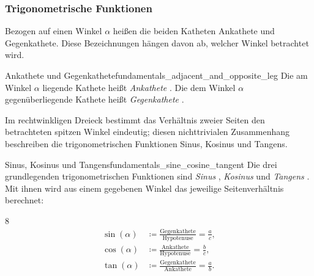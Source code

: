 \subsubsection{Trigonometrische Funktionen}
\label{subsubsec:fundamentals_right_triangles_trigonometric_ratios}

Bezogen auf einen Winkel $\alpha$ heißen die beiden Katheten Ankathete und
Gegenkathete. Diese Bezeichnungen hängen davon ab, welcher Winkel betrachtet
wird.

\begin{DefinitionBox}{Ankathete und Gegenkathete}{fundamentals_adjacent_and_opposite_leg}
  Die am Winkel $\alpha$ liegende Kathete heißt \emph{Ankathete}
  . Die dem Winkel $\alpha$ gegenüberliegende
  Kathete heißt \emph{Gegenkathete} .

  \begin{center}
  \end{center}
\end{DefinitionBox}

\IfClozeTF{\clearpage}{}
Im rechtwinkligen Dreieck bestimmt das Verhältnis zweier Seiten den
betrachteten spitzen Winkel eindeutig; diesen nichttrivialen Zusammenhang
beschreiben die trigonometrischen Funktionen Sinus, Kosinus und Tangens.

\begin{DefinitionBox}{Sinus, Kosinus und Tangens}{fundamentals_sine_cosine_tangent}
  Die drei grundlegenden trigonometrischen Funktionen sind
  \emph{Sinus} , \emph{Kosinus}  und
  \emph{Tangens} . Mit ihnen wird aus einem gegebenen
  Winkel das jeweilige Seitenverhältnis berechnet:
  \par\smallskip
  \noindent
  \begin{minipage}[c]{0.54\linewidth}
    \begin{ClozeArea}[18]{8}
      \begin{align*}
        \sin(\alpha)
          &\coloneqq\frac{\text{Gegenkathete}}{\text{Hypotenuse}}
           =\frac{a}{c},\\
        \cos(\alpha)
          &\coloneqq\frac{\text{Ankathete}}{\text{Hypotenuse}}
           =\frac{b}{c},\\
        \tan(\alpha)
          &\coloneqq\frac{\text{Gegenkathete}}{\text{Ankathete}}
           =\frac{a}{b}.
      \end{align*}
    \end{ClozeArea}
  \end{minipage}\hfill
  \begin{minipage}[c]{0.42\linewidth}
    \centering
  \end{minipage}
\end{DefinitionBox}

